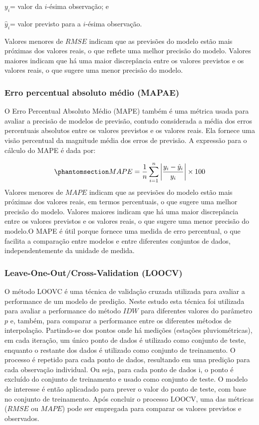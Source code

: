 \documentclass[
]{agujournal2019}
\begin{document}
\(y_i\)= valor da \(i\)-ésima observação; e

\(\hat{y}_i\)= valor previsto para a \(i\)-ésima observação.

Valores menores de \(RMSE\) indicam que as previsões do modelo estão
mais próximas dos valores reais, o que reflete uma melhor precisão do
modelo. Valores maiores indicam que há uma maior discrepância entre os
valores previstos e os valores reais, o que sugere uma menor precisão do
modelo.

\subsubsection{Erro percentual absoluto médio
(MAPAE)}\label{erro-percentual-absoluto-muxe9dio-mapae}

O Erro Percentual Absoluto Médio (MAPE) também é uma métrica usada para
avaliar a precisão de modelos de previsão, contudo considerada a média
dos erros percentuais absolutos entre os valores previstos e os valores
reais. Ela fornece uma visão percentual da magnitude média dos erros de
previsão. A expressão para o cálculo do MAPE é dada por:

\begin{equation}\phantomsection\label{eq-Eq10}{
MAPE = \frac{1}{n} \sum_{i=1}^{n} \left| \frac{y_i - \hat{y}_i}{y_i} \right| \times 100
}\end{equation} Valores menores de \(MAPE\) indicam que as previsões do
modelo estão mais próximas dos valores reais, em termos percentuais, o
que sugere uma melhor precisão do modelo. Valores maiores indicam que há
uma maior discrepância entre os valores previstos e os valores reais, o
que sugere uma menor precisão do modelo.O MAPE é útil porque fornece uma
medida de erro percentual, o que facilita a comparação entre modelos e
entre diferentes conjuntos de dados, independentemente da unidade de
medida.

\subsubsection{Leave-One-Out/Cross-Validation
(LOOCV)}\label{leave-one-outcross-validation-loocv}

O método LOOVC é uma técnica de validação cruzada utilizada para avaliar
a performance de um modelo de predição. Neste estudo esta técnica foi
utilizada para avaliar a performance do método \(IDW\) para diferentes
valores do parâmetro \(p\) e, também, para comparar a performance entre
os diferentes métodos de interpolação. Partindo-se dos pontos onde há
medições (estações pluviométricas), em cada iteração, um único ponto de
dados é utilizado como conjunto de teste, enquanto o restante dos dados
é utilizado como conjunto de treinamento. O processo é repetido para
cada ponto de dados, resultando em uma predição para cada observação
individual. Ou seja, para cada ponto de dados i, o ponto é excluído do
conjunto de treinamento e usado como conjunto de teste. O modelo de
interesse é então aplicadado para prever o valor do ponto de teste, com
base no conjunto de treinamento. Após concluir o processo LOOCV, uma das
métricas (\(RMSE\) ou \(MAPE\)) pode ser empregada para comparar os
valores previstos e observados.
\end{document}
